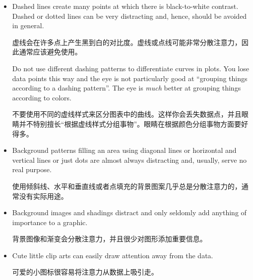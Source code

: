 \begin{itemize}
    \item Dashed lines create many points at which there is black-to-white
        contrast. Dashed or dotted lines can be very distracting and, hence,
        should be avoided in general.

        虚线会在许多点上产生黑到白的对比度。虚线或点线可能非常分散注意力，因此通常应该避免使用。

Do not use different dashing patterns to differentiate curves in
        plots. You lose data points this way and the eye is not particularly
        good at ``grouping things according to a dashing pattern''. The eye
        is \emph{much} better at grouping things according to colors.

        不要使用不同的虚线样式来区分图表中的曲线。这样你会丢失数据点，并且眼睛并不特别擅长“根据虚线样式分组事物”。眼睛在根据颜色分组事物方面要好得多。


    \item Background patterns filling an area using  diagonal lines or
        horizontal and vertical lines or just dots are almost always
        distracting and, usually, serve no real purpose.

        使用倾斜线、水平和垂直线或者点填充的背景图案几乎总是分散注意力的，通常没有实际用途。


    \item Background images and shadings distract and only seldomly add
        anything of importance to a graphic.

        背景图像和渐变会分散注意力，并且很少对图形添加重要信息。


    \item Cute little clip arts can easily draw attention away from the data.

    可爱的小图标很容易将注意力从数据上吸引走。


\end{itemize}
